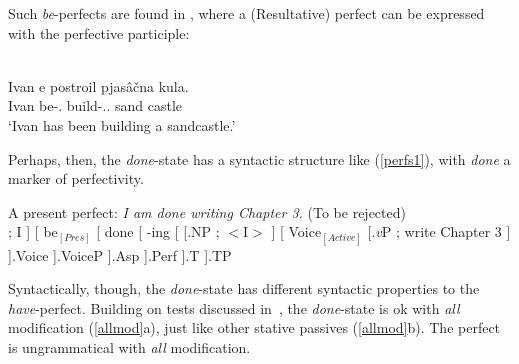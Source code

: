 \documentclass[output=paper,modfonts,nonflat]{langsci/langscibook}
\begin{document}
Such \emph{be}-perfects are found in , where a (Resultative)
perfect can be expressed with the perfective participle:

\begin{exe}
    \ex {}\\
    \gll  Ivan e postroil pjas\^{a}\v{c}na kula. \\
    Ivan be-\Tsg.\Prs{} build-\Prf.\M.\Sg{} sand castle \\
    \trans `Ivan has been building a sandcastle.' \hfill{\citep[296]{Pancheva2003a}}
\end{exe}

Perhaps, then, the \emph{done}-state has a syntactic structure like
(\ref{perfs1}), with \emph{done} a marker of perfectivity.

\begin{exe}
\ex A present perfect: {\em I am done writing Chapter 3.} (To be
rejected)\label{perfs1}\\
\vspace{12pt}
    \Tree
        [
            [.NP \edge[roof]; {I} ]
            [
                be$_{[Pres]}$
                [
                    done
                    [
                        -ing
                        [
                            [.NP \edge[roof]; {$<$I$>$} ]
                            [
                                Voice$_{[Active]}$
                                [.\emph{v}P \edge[roof]; {write Chapter 3} ]
                            ].Voice
                        ].VoiceP
                    ].Asp
                ].Perf
            ].T
        ].TP
\end{exe}

Syntactically, though, the \emph{done}-state has different syntactic properties
to the  \emph{have}-perfect. Building on tests discussed
in~\cite{Fruehwald2015a}, the \emph{done}-state is ok with {\em all}
modification (\ref{allmod}a), just like other stative passives (\ref{allmod}b).
The perfect is ungrammatical with {\em all} modification.

\begin{exe}
\ex\label{allmod}
\begin{xlist}
\end{xlist}
\end{exe}
\end{document}
